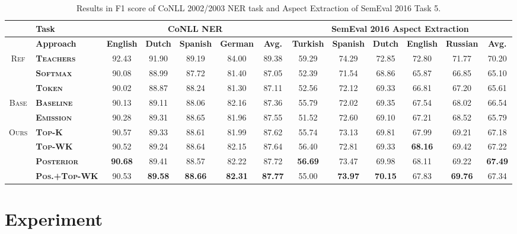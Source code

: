 \documentclass[11pt,a4paper]{article}
\begin{document}
\begin{table*}[t!]
\setlength\tabcolsep{2pt}
\centering
\small
\begin{tabular}{c|l|cccc|c||ccccc|c}
\hline\hline
& \bf Task &  \multicolumn{5}{c||}{\bf CoNLL NER} &  \multicolumn{6}{c}{\bf SemEval 2016 Aspect Extraction}\\
\hline
&\bf Approach &   \bf English & \bf Dutch    & \bf Spanish    & \bf German    & \bf Avg.  & \bf Turkish    & \bf Spanish    & \bf Dutch    & \bf English    & \bf Russian    & \bf Avg.  \\
\hline
\multirow{3}{*}{\textsc{Ref}}&\bf \textsc{Teachers}               & 92.43 & 91.90 & 89.19 & 84.00 & 89.38 & 59.29 & 74.29 & 72.85 & 72.80 & 71.77 & 70.20 \\
&\bf \textsc{Softmax} & 90.08 & 88.99 &  87.72 & 81.40 & 87.05 & 52.39 & 71.54 & 68.86 & 65.87 & 66.85 & 65.10 \\
& \bf \textsc{Token} & 90.02 & 88.87 & 88.24 & 81.30 & 87.11 & 52.56 & 72.12 & 69.33 & 66.81 & 67.20 & 65.61 \\
\hline
\multirow{2}{*}{\textsc{Base}}&\bf \textsc{Baseline}               & 90.13 & 89.11 & 88.06 & 82.16 & 87.36 & 55.79 & 72.02 & 69.35 & 67.54 & 68.02 & 66.54 \\
& \bf \textsc{Emission}            & 90.28 & 89.31 & 88.65 & 81.96 & 87.55 & 51.52 & 72.60 & 69.10 & 67.21 & 68.52 & 65.79 \\
\hline
\multirow{4}{*}{\textsc{Ours}}&\bf \textsc{Top-K}                   & 90.57 &  89.33  & 88.61&   81.99 &  87.62  & 55.74 & 73.13 & 69.81 & 67.99 & 69.21 & 67.18 \\
&\bf \textsc{Top-WK}      & 90.52&   89.24&   88.64&   82.15&   87.64  & 56.40 & 72.81 & 69.33 & \textbf{68.16} & 69.42 & 67.22 \\
&\bf \textsc{Posterior}              & \textbf{90.68} & 89.41 & 88.57 & 82.22 & 87.72 & \textbf{56.69} & 73.47 & 69.98 & 68.11 & 69.22 & \textbf{67.49} \\
&\bf \textsc{Pos.+Top-WK} & 90.53 & \textbf{89.58} & \textbf{88.66} & \textbf{82.31} & \textbf{87.77} & 55.00 & \textbf{73.97} & \textbf{70.15} & 67.83 & \textbf{69.76} & 67.34 \\
\hline\hline
\end{tabular}
\caption{Results in F1 score of CoNLL 2002/2003 NER task and Aspect Extraction of SemEval 2016 Task 5.}
\label{tab:ner}
\end{table*}

\section{Experiment}
\end{document}
